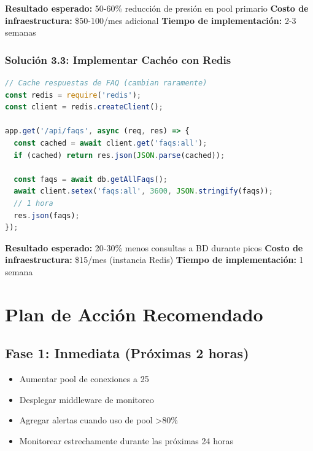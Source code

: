 \documentclass[12pt,a4paper]{article}
\begin{document}
\textbf{Resultado esperado:} 50-60\% reducción de presión en pool primario  
\textbf{Costo de infraestructura:} \$50-100/mes adicional  
\textbf{Tiempo de implementación:} 2-3 semanas

\subsubsection{Solución 3.3: Implementar Cachéo con Redis}

\begin{lstlisting}[language=JavaScript, caption=Caching con Redis]
// Cache respuestas de FAQ (cambian raramente)
const redis = require('redis');
const client = redis.createClient();

app.get('/api/faqs', async (req, res) => {
  const cached = await client.get('faqs:all');
  if (cached) return res.json(JSON.parse(cached));
  
  const faqs = await db.getAllFaqs();
  await client.setex('faqs:all', 3600, JSON.stringify(faqs));
  // 1 hora
  res.json(faqs);
});
\end{lstlisting}

\textbf{Resultado esperado:} 20-30\% menos consultas a BD durante picos  
\textbf{Costo de infraestructura:} \$15/mes (instancia Redis)  
\textbf{Tiempo de implementación:} 1 semana

\newpage

\section{Plan de Acción Recomendado}

\subsection{Fase 1: Inmediata (Próximas 2 horas)}

\begin{itemize}
    \item[$\square$] Aumentar pool de conexiones a 25
    \item[$\square$] Desplegar middleware de monitoreo
    \item[$\square$] Agregar alertas cuando uso de pool \textgreater 80\%
    \item[$\square$] Monitorear estrechamente durante las próximas 24 horas
\end{itemize}
\end{document}
